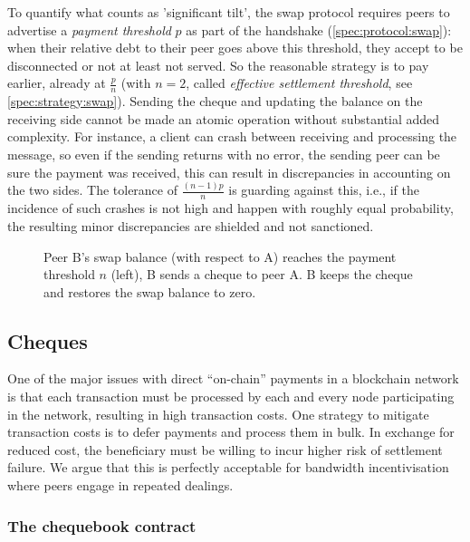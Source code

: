 To quantify what counts as 'significant tilt', the swap protocol requires peers to advertise a \emph{payment threshold} $p$ as part of the handshake (\ref{spec:protocol:swap}): when their relative debt to their peer goes  above this threshold, they accept to be disconnected or not at least not served. So the reasonable  strategy is to pay earlier, already at $\frac{p}{n}$ (with $n=2$, called \emph{effective settlement threshold},  see \ref{spec:strategy:swap}). Sending the cheque and updating the  balance on the receiving side cannot be made an atomic operation without substantial added complexity. For instance, a client can  crash between receiving and processing the message, so even if the sending returns with no error, the sending peer can be sure the payment was received, this can result in discrepancies in accounting on the two sides. The tolerance of $\frac{(n-1)p}{n}$ is guarding against this, i.e., if the incidence of such crashes is not high and happen with roughly equal probability, the resulting minor discrepancies are shielded and not sanctioned.

\begin{center}
\begin{figure}[htbp]

\caption{Peer B's swap balance (with respect to A) reaches the payment threshold $n$ (left),
B sends a cheque to peer A. B keeps the cheque and restores the swap balance to zero.}
\label{fig:chequeswap}
\end{figure}
\end{center}

\subsection{Cheques}\label{sec:cheques}

One of the major issues with direct ``on-chain'' payments in a blockchain network is that each transaction must be processed by each and every node participating in the network, resulting in high transaction costs. One strategy to mitigate transaction costs is to defer payments and process them in bulk. In exchange for reduced cost, the beneficiary must be willing to incur higher risk of settlement failure. We argue that this is perfectly acceptable for bandwidth incentivisation where peers engage in repeated dealings.


\subsubsection{The chequebook contract}

